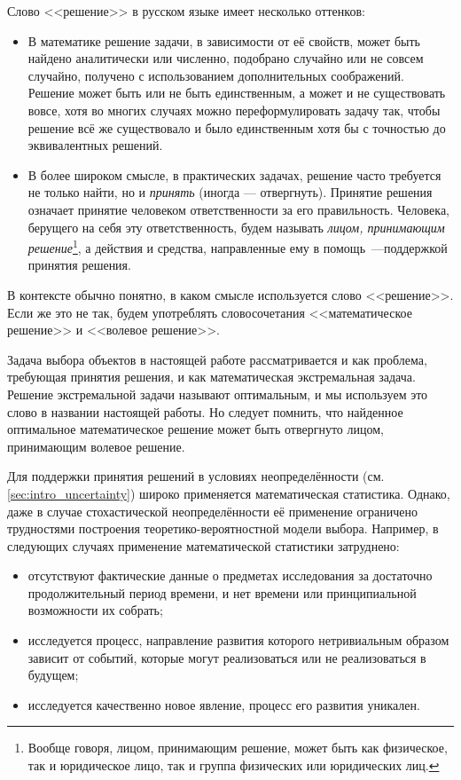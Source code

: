 Слово <<решение>> в русском языке имеет несколько оттенков: 
\begin{itemize}
  \item В математике решение задачи, в зависимости от её свойств, может быть найдено аналитически или численно, подобрано случайно или не совсем случайно, получено с использованием дополнительных соображений. Решение может быть или не быть единственным, а может и не существовать вовсе,  хотя во многих случаях можно переформулировать задачу так, чтобы решение всё же существовало и было единственным хотя бы с точностью до эквивалентных решений. 
  \item В более широком смысле, в практических задачах, решение часто требуется не только найти, но и {\sl принять} (иногда --- отвергнуть). Принятие решения означает принятие человеком ответственности за его правильность. Человека, берущего на себя эту ответственность, будем называть {\sl лицом, принимающим решение}\footnote{Вообще говоря, лицом, принимающим решение, может быть как физическое, так и юридическое лицо, так и группа физических или юридических лиц.}, а действия и средства, направленные ему в помощь~---поддержкой принятия решения. 
\end{itemize}
В контексте обычно понятно, в каком смысле используется слово <<решение>>. Если же это не так, будем употреблять словосочетания <<математическое решение>> и <<волевое решение>>.
 
Задача выбора объектов в настоящей работе рассматривается и как проблема, требующая принятия решения, и как математическая экстремальная задача. Решение экстремальной задачи называют оптимальным, и мы используем это слово в названии настоящей работы. Но следует помнить, что найденное оптимальное математическое решение может быть отвергнуто лицом, принимающим волевое решение.

Для поддержки принятия решений в условиях неопределённости (см. \ref{sec:intro_uncertainty}) широко применяется математическая статистика. Однако, даже в случае стохастической неопределённости её применение ограничено трудностями построения теоретико-вероятностной модели выбора.  Например, в следующих случаях применение математической статистики затруднено:
\begin{itemize}
 \item отсутствуют фактические данные о предметах исследования за достаточно продолжительный период времени, и нет времени или принципиальной возможности их собрать; 
 \item исследуется процесс, направление развития которого нетривиальным образом зависит от событий, которые могут реализоваться или не реализоваться в будущем;
 \item исследуется качественно новое явление, процесс его развития уникален.
\end{itemize}

